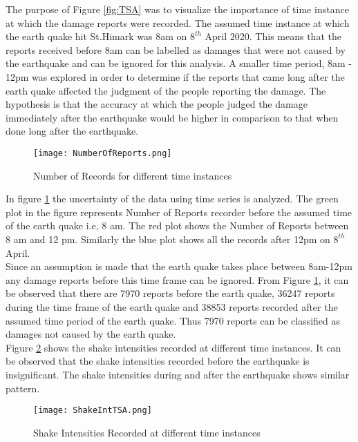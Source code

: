 \documentclass[12pt]{extarticle}
\begin{document}
The purpose of Figure \ref{fig:TSA} was to visualize the importance of time instance at which the damage reports were recorded. The assumed time instance at which the earth quake hit St.Himark was 8am on \(8^{th}\) April 2020. This means that the reports received before 8am can be labelled as damages that were not caused by the earthquake and can be ignored for this analysis. A smaller time period, 8am - 12pm was explored in order to determine if the reports that came long after the earth quake affected the judgment of the people reporting the damage. The hypothesis is that the accuracy at which the people judged the damage immediately after the earthquake would be higher in comparison to that when done long after the earthquake. 
\begin{figure}[H]
\centering
	\texttt{[image: NumberOfReports.png]}
	\caption{Number of Records for different time instances }
	\label{fig:TSS}
\end{figure}
 
 In figure \ref{fig:TSS} the uncertainty of the data using time series is analyzed. The green plot in the figure represents Number of Reports recorder before the assumed time of the earth quake i.e, 8 am. The red plot shows the Number of Reports between 8 am and 12 pm. Similarly the blue plot shows all the records after 12pm on \(8^{th}\) April. \\
 
 Since an assumption is made that the earth quake takes place between 8am-12pm any damage reports before this time frame can be ignored. From Figure \ref{fig:TSS}, it can be observed that there are 7970 reports before the earth quake, 36247 reports during the time frame of the earth quake and 38853 reports recorded after the assumed time period of the earth quake. Thus 7970 reports can be classified as damages not caused by the earth quake. \\ 
 
 Figure \ref{fig:SiTSA} shows the shake intensities recorded at different time instances. It can be observed that the shake intensities recorded before the earthquake is insignificant. The shake intensities during and after the earthquake shows similar pattern. \\
 
 \begin{figure}[H]
\centering
	\texttt{[image: ShakeIntTSA.png]}
	\caption{Shake Intensities Recorded at different time instances }
	\label{fig:SiTSA}
\end{figure}
 
\end{document}
